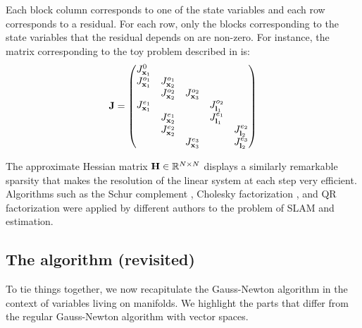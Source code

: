 Each block column corresponds to one of the state variables and each row corresponds to a residual. For each row, only the blocks corresponding to the
state variables that the residual depends on are non-zero. For instance, the matrix corresponding to the toy problem described in  is:
\begin{equation}
    {\bf J}=
    \begin{pmatrix}
        J^{0}_{{\bf x}_1} &   &     &     &     \\
       J^{o_1}_{{\bf x}_1} & J^{o_1}_{{\bf x}_2}  &     &     &     \\
                       & J^{o_2}_{{\bf x}_2}  & J^{o_2}_{{\bf x}_3}   &     &     \\
       J^{e_1}_{{\bf x}_1} &                  &     &  J^{o_2}_{{\bf l}_1}   &     \\
                       & J^{e_1}_{{\bf x}_2}  &     &  J^{e_1}_{{\bf l}_1}   &     \\
                       & J^{e_2}_{{\bf x}_2}  &     &     &  J^{e_2}_{{\bf l}_2}   \\
                       &                  & J^{e_3}_{{\bf x}_3}    &     &  J^{e_3}_{{\bf l}_2}   \\
    \end{pmatrix}
    \label{eq:sparse_jac}
\end{equation}



The approximate Hessian matrix ${\bf H} \in \mathbb{R}^{N \times N}$ displays a similarly remarkable sparsity that makes the resolution of the linear system
at each step very efficient. Algorithms such as the Schur complement \cite[A.5.5]{boyd2004convex}, Cholesky factorization \cite[C.3]{boyd2004convex}, 
and QR factorization \cite[C.5]{boyd2004convex} were applied by different authors to the problem of SLAM and estimation. 

\subsection{The algorithm (revisited)}
To tie things together, we now recapitulate the Gauss-Newton algorithm in the context of variables living on manifolds. 
We highlight the parts that differ from the regular Gauss-Newton algorithm with vector spaces.

